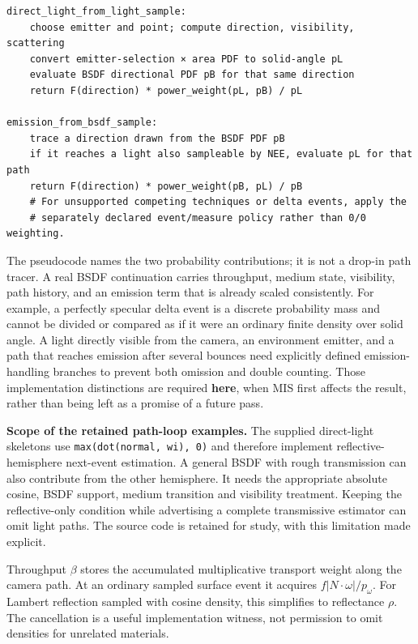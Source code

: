 \begin{verbatim}
direct_light_from_light_sample:
    choose emitter and point; compute direction, visibility, scattering
    convert emitter-selection × area PDF to solid-angle pL
    evaluate BSDF directional PDF pB for that same direction
    return F(direction) * power_weight(pL, pB) / pL

emission_from_bsdf_sample:
    trace a direction drawn from the BSDF PDF pB
    if it reaches a light also sampleable by NEE, evaluate pL for that path
    return F(direction) * power_weight(pB, pL) / pB
    # For unsupported competing techniques or delta events, apply the
    # separately declared event/measure policy rather than 0/0 weighting.
\end{verbatim}

The pseudocode names the two probability contributions; it is not a drop-in path tracer. A real BSDF continuation carries throughput, medium state, visibility, path history, and an emission term that is already scaled consistently. For example, a perfectly specular delta event is a discrete probability mass and cannot be divided or compared as if it were an ordinary finite density over solid angle. A light directly visible from the camera, an environment emitter, and a path that reaches emission after several bounces need explicitly defined emission-handling branches to prevent both omission and double counting. Those implementation distinctions are required \textbf{here}, when MIS first affects the result, rather than being left as a promise of a future pass.

\textbf{Scope of the retained path-loop examples.} The supplied direct-light skeletons use \texttt{max(dot(normal,\ wi),\ 0)} and therefore implement reflective-hemisphere next-event estimation. A general BSDF with rough transmission can also contribute from the other hemisphere. It needs the appropriate absolute cosine, BSDF support, medium transition and visibility treatment. Keeping the reflective-only condition while advertising a complete transmissive estimator can omit light paths. The source code is retained for study, with this limitation made explicit.

Throughput \(\beta\) stores the accumulated multiplicative transport weight along the camera path. At an ordinary sampled surface event it acquires \(f\lvert N\cdot\omega\rvert/p_\omega\). For Lambert reflection sampled with cosine density, this simplifies to reflectance \(\rho\). The cancellation is a useful implementation witness, not permission to omit densities for unrelated materials.

